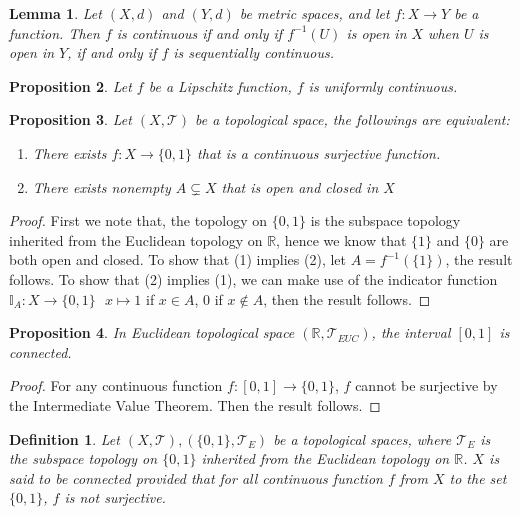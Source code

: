 \documentclass[11pt,oneside]{book}
\theoremstyle{break}
\theoremstyle{break}
\newtheorem{lem}{Lemma}[thm]
\newtheorem{prop}[lem]{Proposition}
\newtheorem{defn}{Definition}[corL]
\newcommand{\R}{\mathbb{R}}
\newcommand{\T}{\mathcal{T}}
\begin{document}
\begin{lem}
Let $(X,d)$ and $(Y,d)$ be metric spaces, and let $f:X\to Y$ be a function. Then $f$ is continuous if and only if $f^{-1}(U)$ is open in $X$ when $U$ is open in $Y$, if and only if $f$ is sequentially continuous.
\end{lem}

\begin{prop}
Let $f$ be a Lipschitz function, $f$ is uniformly continuous.
\end{prop}

\begin{prop}
Let $(X,\T)$ be a topological space, the followings are equivalent:
\begin{enumerate}[topsep=3pt,itemsep=-1ex,partopsep=1ex,parsep=1ex]
\item There exists $f:X \to \{0,1\}$ that is a continuous surjective function.
\item There exists nonempty $A \subsetneq X$ that is open and closed in $X$
\end{enumerate}
\end{prop}
\begin{proof}
First we note that, the topology on $\{0,1\}$ is the subspace topology inherited from the Euclidean topology on $\R$, hence we know that $\{1\}$ and $\{0\}$ are both open and closed. To show that (1) implies (2), let $A = f^{-1}(\{1\})$, the result follows. To show that (2) implies (1), we can make use of the indicator function $\mathbb{I}_A: X \to \{0,1\} \ \ \ x\mapsto 1$ if $x \in A$, $0$ if $x \notin A$, then the result follows.
\end{proof}


\begin{prop}
In Euclidean topological space $(\R,\T_{EUC})$, the interval $[0,1]$ is connected. 
\end{prop}
\begin{proof}
For any continuous function $f:[0,1]\to \{0,1\}$, $f$ cannot be surjective by the Intermediate Value Theorem. Then the result follows.
\end{proof}

\begin{defn}
Let $(X,\T), (\{0,1\}, \T_E)$ be a topological spaces, where $\T_E$ is the subspace topology on $\{0,1\}$ inherited from the Euclidean topology on $\R$. $X$ is said to be connected provided that for all continuous function $f$ from $X$ to the set $\{0,1\}$, $f$ is not surjective. 
\end{defn}
\end{document}

